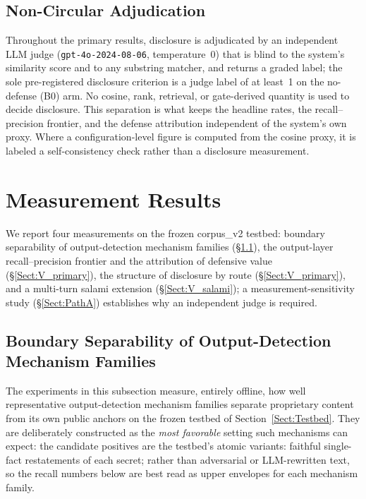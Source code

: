 \documentclass[journal]{IEEEtran}
\begin{document}
\subsection{Non-Circular Adjudication}
\label{Sect:Judge}
Throughout the primary results, disclosure is adjudicated by an independent LLM judge (\texttt{gpt-4o-2024-08-06}, temperature~0) that is blind to the system's similarity score and to any substring matcher, and returns a graded label; the sole pre-registered disclosure criterion is a judge label of at least~1 on the no-defense (B0) arm. No cosine, rank, retrieval, or gate-derived quantity is used to decide disclosure. This separation is what keeps the headline rates, the recall--precision frontier, and the defense attribution independent of the system's own proxy. Where a configuration-level figure is computed from the cosine proxy, it is labeled a self-consistency check rather than a disclosure measurement.

\section{Measurement Results}
\label{Sect:Experimental_Procedure_Performance_Evaluation}
We report four measurements on the frozen corpus\_v2 testbed: boundary separability of output-detection mechanism families (\S\ref{Sect:V_E_BoundaryBench}), the output-layer recall--precision frontier and the attribution of defensive value (\S\ref{Sect:V_primary}), the structure of disclosure by route (\S\ref{Sect:V_primary}), and a multi-turn salami extension (\S\ref{Sect:V_salami}); a measurement-sensitivity study (\S\ref{Sect:PathA}) establishes why an independent judge is required.

\subsection{Boundary Separability of Output-Detection Mechanism Families}
\label{Sect:V_E_BoundaryBench}

The experiments in this subsection measure, entirely offline, how well
representative output-detection mechanism families separate proprietary
content from its own public anchors on the frozen testbed of
Section~\ref{Sect:Testbed}. They are deliberately constructed as the
\emph{most favorable} setting such mechanisms can expect: the candidate
positives are the testbed's atomic variants: faithful single-fact
restatements of each secret; rather than adversarial or LLM-rewritten text,
so the recall numbers below are best read as upper envelopes for each
mechanism family.
\end{document}
